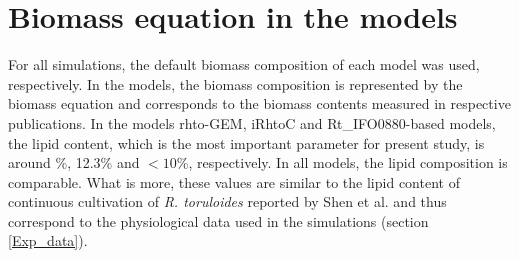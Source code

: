 

\section{Biomass equation in the models}



For all simulations, the default biomass composition of each model was used, respectively. In the models, the biomass composition is represented by the biomass equation and corresponds to the biomass contents measured in respective publications. 
In the models rhto-GEM, iRhtoC and Rt\_IFO0880-based models, the lipid content, which is the most important parameter for present study, is around \%, 12.3\% and $<10$\%, respectively. In all models, the lipid composition is comparable. What is more, these values are similar to the lipid content of continuous cultivation of \textit{R. toruloides} reported by Shen et al. \cite{Shen2013} and thus correspond to the physiological data used in the simulations (section \ref{Exp_data}).

